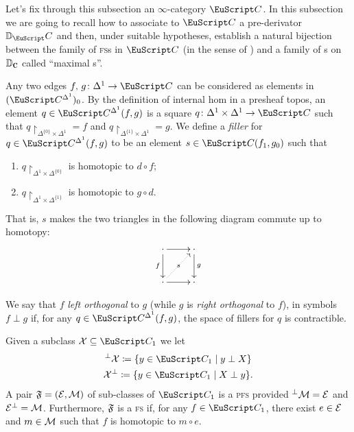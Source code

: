 Let's fix through this subsection an $\infty$-category $\iC$. In this subsection we are going to recall how to associate to $\iC$ a pre-derivator $\D_\iC$ and then, under suitable hypotheses, establish a natural bijection between the family of \textsc{fs}s in $\iC$ (in the sense of \cite{joyal2008notes}) and a family of {\dfs}s on $\D_\C$ called ``maximal {\dfs}s''. 
%
\begin{definition}
Any two edges $f,\, g\colon \Delta^{1}\to \iC$ can be considered as elements in $(\iC^{\Delta^{1}})_0$. By the definition of internal hom in a presheaf topos, an element $q\in \iC^{\Delta^{1}}(f,g)$ is a square $q\colon \Delta^{1}\times \Delta^{1} \to \iC$ such that $q\restriction_{\Delta^{\{0\}}\times \Delta^{1}}=f$ and $q\restriction_{\Delta^{\{1\}}\times \Delta^{1}}=g$. We define a \emph{filler} for $q\in \iC^{\Delta^{1}}(f,g)$ to be an element $s\in \iC(f_1,g_0)$ such that 
\begin{enumerate}
\item $q\restriction_{\Delta^{1}\times \Delta^{\{0\}}}$ is homotopic to $d\circ f$;
\item $q\restriction_{\Delta^{1}\times \Delta^{\{1\}}}$ is homotopic to $g\circ d$.
\end{enumerate}
That is, $s$ makes the two triangles in the following diagram commute up to homotopy:
\[
\xymatrix{
\cdot\ar[r]\ar[d]_f&\cdot\ar[d]^g\\
\cdot\ar[r]\ar@{.>}[ur]|{\ s\ }&\cdot
}
\]
\end{definition}
\begin{definition}[orthogonality]
We say that $f$ \emph{left orthogonal} to $g$ (while $g$ is \emph{right orthogonal} to $f$), in symbols $f\perp g$ if, for any $q\in \iC^{\Delta^{1}}(f,g)$, the space of fillers for $q$ is contractible. 
\end{definition}
\begin{definition}
Given a subclass $\mathcal{X}\subseteq \iC_1$ we let
\begin{gather*}
{}^{\perp}\mathcal{X}\coloneqq \{y\in\iC_1 \mid y\perp X\}\\
\mathcal{X}^{\perp}\coloneqq \{y\in\iC_1 \mid X\perp y\}.
\end{gather*}
A pair $\mathfrak{F}=(\mathcal{E},\mathcal{M})$ of sub-classes of $\iC_1$ is a \textsc{pfs} provided ${}^{\perp}\mathcal{M}=\mathcal{E}$ and $\mathcal{E}^\perp=\mathcal{M}$. Furthermore, $\mathfrak{F}$ is a \textsc{fs} if, for any $f\in \iC_1$, there exist $e\in \mathcal{E}$ and $m\in\mathcal{M}$ such that $f$ is homotopic to $m\circ e$. 
\end{definition}
